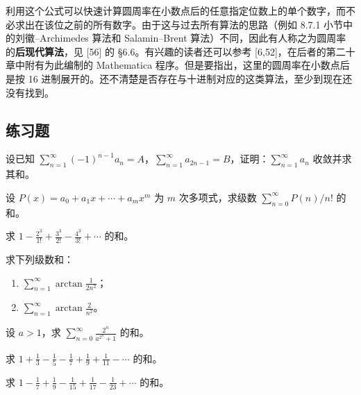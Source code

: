 \begin{xremark}
利用这个公式可以快速计算圆周率在小数点后的任意指定位数上的单个数字，而不必求出在该位之前的所有数字。由于这与过去所有算法的思路（例如 8.7.1 小节中的刘徽--Archimedes 算法和 Salamin--Brent 算法）不同，因此有人称之为圆周率的\textbf{后现代算法}，见 [56] 的 §6.6。有兴趣的读者还可以参考 [6,52]，在后者的第二十章中附有为此编制的 Mathematica 程序。但是要指出，这里的圆周率在小数点后是按 16 进制展开的。还不清楚是否存在与十进制对应的这类算法，至少到现在还没有找到。
\end{xremark}

\subsection{练习题}

\begin{xexercise}[1]
设已知 $\sum_{n=1}^{\infty}(-1)^{n-1}a_n=A$，$\sum_{n=1}^{\infty}a_{2n-1}=B$，证明：$\sum_{n=1}^{\infty}a_n$ 收敛并求其和。
\end{xexercise}

\begin{xexercise}[2]
设 $P(x)=a_0+a_1x+\cdots+a_mx^m$ 为 $m$ 次多项式，求级数 $\sum_{n=0}^{\infty}P(n)/n!$ 的和。
\end{xexercise}

\begin{xexercise}[3]
求 $\displaystyle 1-\frac{2^3}{1!}+\frac{3^3}{2!}-\frac{4^3}{3!}+\cdots$ 的和。
\end{xexercise}

\begin{xexercise}[4]
求下列级数和：
\begin{enumerate}[label=(\arabic*)]
\item $\displaystyle\sum_{n=1}^{\infty}\arctan\frac1{2n^2}$；
\item $\displaystyle\sum_{n=1}^{\infty}\arctan\frac2{n^2}$。
\end{enumerate}
\end{xexercise}

\begin{xexercise}[5]
设 $a>1$，求 $\displaystyle\sum_{n=0}^{\infty}\frac{2^n}{a^{2^n}+1}$ 的和。
\end{xexercise}

\begin{xexercise}[6]
求 $\displaystyle 1+\frac13-\frac15-\frac17+\frac19+\frac1{11}-\cdots$ 的和。
\end{xexercise}

\begin{xexercise}[7]
求 $\displaystyle 1-\frac17+\frac19-\frac1{15}+\frac1{17}-\frac1{23}+\cdots$ 的和。
\end{xexercise}

